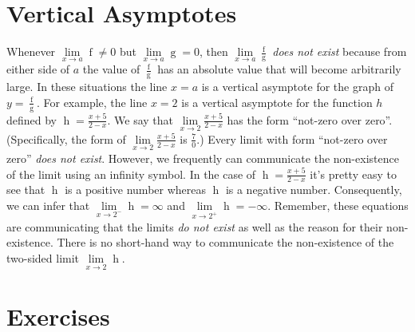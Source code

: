\documentclass[12pt,]{book}
\theoremstyle{plain}
\theoremstyle{definition}
\numberwithin{equation}{section}
\newcommand{\fe}[2]{\mathop{{#1}{\left(#2\right)}}}
\begin{document}
\section[Vertical Asymptotes]{Vertical Asymptotes}\label{section-vertical-asymptotes}
Whenever \(\lim\limits_{x\to a}\fe{f}{x}\neq0\) but \(\lim\limits_{x\to a}\fe{g}{x}=0\), then \(\lim\limits_{x\to a}\frac{\fe{f}{x}}{\fe{g}{x}}\) \emph{does not exist} because from either side of \(a\) the value of \(\frac{\fe{f}{x}}{\fe{g}{x}}\) has an absolute value that will become arbitrarily large. In these situations the line \(x=a\) is a vertical asymptote for the graph of \(y=\frac{\fe{f}{x}}{\fe{g}{x}}\). For example, the line \(x=2\) is a vertical asymptote for the function \(h\) defined by \(\fe{h}{x}=\frac{x+5}{2-x}\). We say that \(\lim\limits_{x\to 2}\frac{x+5}{2-x}\) has the form ``not-zero over zero''. (Specifically, the form of \(\lim\limits_{x\to 2}\frac{x+5}{2-x}\) is \(\frac{7}{0}\).) Every limit with form ``not-zero over zero'' \emph{does not exist}. However, we frequently can communicate the non-existence of the limit using an infinity symbol. In the case of \(\fe{h}{x}=\frac{x+5}{2-x}\) it's pretty easy to see that \(\fe{h}{1.99}\) is a positive number whereas \(\fe{h}{2.01}\) is a negative number. Consequently, we can infer that \(\lim\limits_{x\to 2^{-}}\fe{h}{x}=\infty\) and \(\lim\limits_{x\to 2^{+}}\fe{h}{x}=-\infty\). Remember, these equations are communicating that the limits \emph{do not exist} as well as the reason for their non-existence. There is no short-hand way to communicate the non-existence of the two-sided limit \(\lim\limits_{x\to 2}\fe{h}{x}\).%
\typeout{************************************************}
\typeout{************************************************}
\section*{Exercises}\label{exercises-11}
\end{document}
